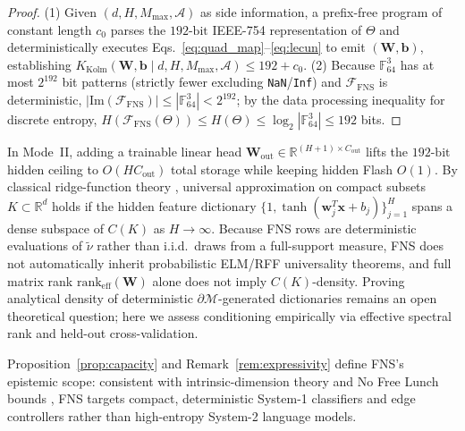 \begin{proof}
(1) Given $(d, H, M_{\max}, \mathcal{A})$ as side information, a prefix-free program of constant length $c_0$ parses the $192\text{-bit}$ IEEE-754 representation of $\Theta$ and deterministically executes Eqs.~\eqref{eq:quad_map}--\eqref{eq:lecun} to emit $(\mathbf{W},\mathbf{b})$, establishing $K_{\mathrm{Kolm}}(\mathbf{W},\mathbf{b}\mid d,H,M_{\max},\mathcal{A}) \le 192 + c_0$. (2) Because $\mathbb{F}_{64}^3$ has at most $2^{192}$ bit patterns (strictly fewer excluding \texttt{NaN}/\texttt{Inf}) and $\mathcal{F}_{\mathrm{FNS}}$ is deterministic, $|\mathrm{Im}(\mathcal{F}_{\mathrm{FNS}})| \le |\mathbb{F}_{64}^3| < 2^{192}$; by the data processing inequality for discrete entropy, $H(\mathcal{F}_{\mathrm{FNS}}(\Theta)) \le H(\Theta) \le \log_2|\mathbb{F}_{64}^3| \le 192$ bits.
\end{proof}

\begin{remark}
\label{rem:expressivity}
In Mode~II, adding a trainable linear head $\mathbf{W}_{\mathrm{out}} \in \mathbb{R}^{(H+1)\times C_{\mathrm{out}}}$ lifts the $192\text{-bit}$ hidden ceiling to $O(HC_{\mathrm{out}})$ total storage while keeping hidden Flash $O(1)$. By classical ridge-function theory \cite{cybenko1989approximation,leshno1993multilayer,huang2006universal}, universal approximation on compact subsets $K \subset \mathbb{R}^d$ holds if the hidden feature dictionary $\{1, \tanh(\mathbf{w}_j^T\mathbf{x}+b_j)\}_{j=1}^H$ spans a dense subspace of $C(K)$ as $H\to\infty$. Because FNS rows are deterministic evaluations of $\tilde{\nu}$ rather than i.i.d.\ draws from a full-support measure, FNS does not automatically inherit probabilistic ELM/RFF universality theorems, and full matrix rank $\mathrm{rank}_{\mathrm{eff}}(\mathbf{W})$ alone does not imply $C(K)$-density. Proving analytical density of deterministic $\partial\mathcal{M}$-generated dictionaries remains an open theoretical question; here we assess conditioning empirically via effective spectral rank \cite{roy2007effective} and held-out cross-validation.
\end{remark}

Proposition~\ref{prop:capacity} and Remark~\ref{rem:expressivity} define FNS's epistemic scope: consistent with intrinsic-dimension theory \cite{li2018intrinsic} and No Free Lunch bounds \cite{wolpert1997no}, FNS targets compact, deterministic System-1 classifiers and edge controllers rather than high-entropy System-2 language models.

